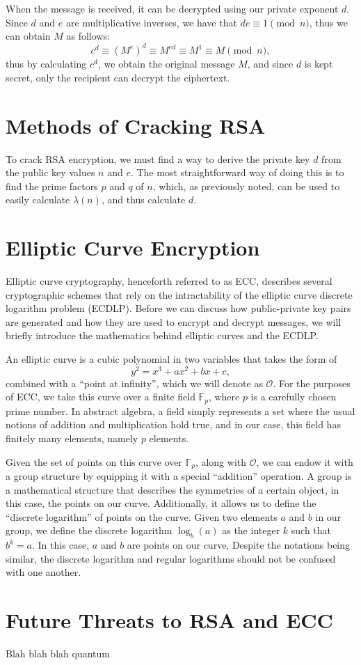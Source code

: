 \documentclass[letterpaper,twocolumn,12pt]{article}
\begin{document}
    When the message is received, it can be decrypted using our private
    exponent \( d \).
    Since \( d \) and \( e \) are multiplicative inverses, we have that
    \( de \equiv 1 \pmod{n} \), thus we can obtain \( M \) as follows:
    \[ c^d \equiv (M^e)^d \equiv M^{ed} \equiv M^1 \equiv M \pmod{n}, \]
    thus by calculating \( c^d \), we obtain the original message \( M \),
    and since \( d \) is kept secret, only the recipient can decrypt the
    ciphertext.

    \section*{Methods of Cracking RSA}

    To crack RSA encryption, we must find a way to derive the private key
    \( d \) from the public key values \( n \) and \( e \). The most
    straightforward way of doing this is to find the prime factors \( p \)
    and \( q \) of \( n \), which, as previously noted, can be used to easily
    calculate \( \lambda(n) \), and thus calculate \( d \).

    \section*{Elliptic Curve Encryption}

    Elliptic curve cryptography, henceforth referred to as ECC, describes
    several cryptographic schemes that rely on the intractability of the
    elliptic curve discrete logarithm problem (ECDLP).
    Before we can discuss how public-private key pairs are generated and how
    they are used to encrypt and decrypt messages, we will briefly introduce
    the mathematics behind elliptic curves and the ECDLP.
    
    An elliptic curve is a cubic polynomial in two variables that takes the
    form of
    \[ y^2 = x^3 + ax^2 + bx + c, \]
    combined with a ``point at infinity'', which we will denote as
    \( \mathcal{O} \).
    For the purposes of ECC, we take this curve over a finite field
    \( \mathbb{F}_p \), where \( p \) is a carefully chosen prime number.
    In abstract algebra, a field simply represents a set where the usual
    notions of addition and multiplication hold true, and in our case, this
    field has finitely many elements, namely \( p \) elements.

    Given the set of points on this curve over \( \mathbb{F}_p \), along with
    \( \mathcal{O} \), we can endow it with a group structure by equipping it
    with a special ``addition'' operation.
    A group is a mathematical structure that describes the symmetries of a
    certain object, in this case, the points on our curve.
    Additionally, it allows us to define the ``discrete logarithm'' of points
    on the curve.
    Given two elements \( a \) and \( b \) in our group, we define the discrete
    logarithm \( \log_b(a) \) as the integer \( k \) such that \( b^k = a \).
    In this case, \( a \) and \( b \) are points on our curve,
    Despite the notations being similar, the discrete logarithm and regular
    logarithms should not be confused with one another.

    \section*{Future Threats to RSA and ECC}

    Blah blah blah quantum

    
    
\end{document}
